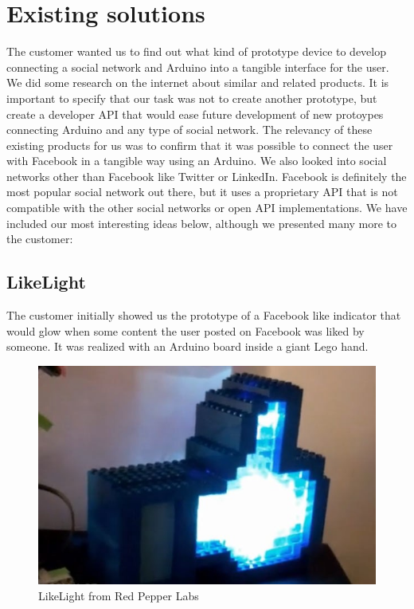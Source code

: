 \section{Existing solutions}
The customer wanted us to find out what kind of prototype device to develop connecting a social network and Arduino
into a tangible interface for the user. We did some research on the internet about similar and related products.  It is 
important to specify that our task was not to create another prototype, but create a  developer API that would ease 
future development of new protoypes connecting Arduino and any type of social network. The relevancy of these 
existing products for us was to confirm that it was possible to connect the user with Facebook in a tangible way using
 an Arduino. We also looked into social networks other than Facebook like Twitter or LinkedIn. Facebook is definitely the 
most popular social network out there, but it uses a proprietary API that is not compatible with the other social 
networks or open API implementations. We have included our most interesting ideas below, although we presented
many more to the customer:

\newpage

\subsection{LikeLight}
The customer initially showed us the prototype of a Facebook like indicator that would glow when some content the
user posted on Facebook was liked by someone. It was realized with an Arduino board inside a giant Lego hand.

\begin{figure}[h!]
\centering \includegraphics[scale=0.85]{img/prestudies-likehand} \caption{LikeLight from Red Pepper Labs}

\label{fig:prestudies-likehand}
\end{figure}

